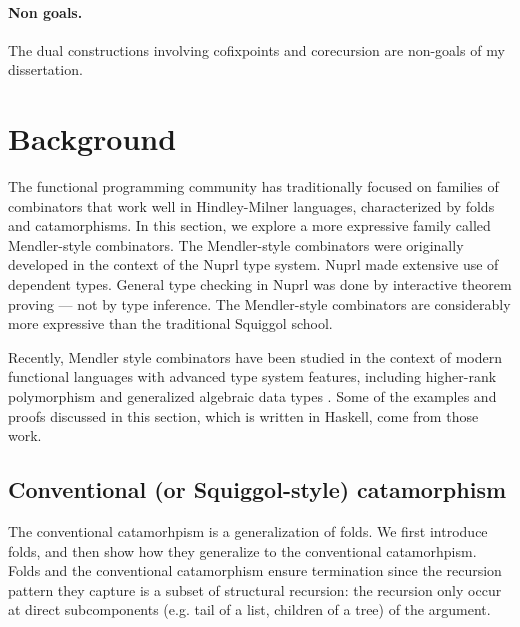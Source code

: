 \documentclass[letterpaper,12pt]{article}
\begin{document}
\paragraph{Non goals.}
The dual constructions involving cofixpoints and corecursion
are non-goals of my dissertation.


\newpage
\section{Background} \label{sec:bg}

The functional programming community has traditionally focused on families of
combinators that work well in Hindley-Milner languages, characterized by folds
and catamorphisms. In this section, we explore a more expressive family called
Mendler-style combinators.  The Mendler-style combinators were originally
developed in the context of the Nuprl\cite{Con86} type system.  Nuprl made
extensive use of dependent types.  General type checking in Nuprl was done by
interactive theorem proving --- not by type inference.
The Mendler-style combinators are considerably more expressive than
the traditional Squiggol school.

Recently, Mendler style combinators have been studied in the context of
modern functional languages with advanced type system features, including
higher-rank polymorphism and generalized algebraic data types
\cite{UusVen99,UusVen00,vene00phd,AbeMatUus03,AbeMatUus05}.
Some of the examples and proofs discussed in this section,
which is written in Haskell, come from those work.

\subsection{Conventional (or Squiggol-style) catamorphism} \label{sec:bg:cata}
The conventional catamorhpism is a generalization of folds.
We first introduce folds, and then show how they generalize to
the conventional catamorhpism.
Folds and the conventional catamorphism ensure termination since the recursion pattern they
capture is a subset of structural recursion: the recursion only occur at direct
subcomponents (e.g. tail of a list, children of a tree) of the argument.
\end{document}
